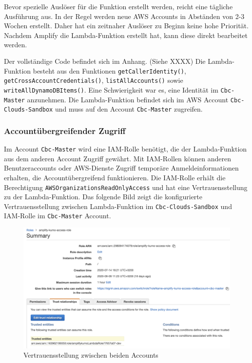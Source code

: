 Bevor spezielle Auslöser für die Funktion erstellt werden, reicht eine tägliche Ausführung aus.
In der Regel werden neue AWS Accounts in Abständen von 2-3 Wochen erstellt.
Daher hat ein zeitnaher Auslöser zu Beginn keine hohe Priorität.
Nachdem Amplify die Lambda-Funktion erstellt hat, kann diese direkt bearbeitet werden.

Der vollständige Code befindet sich im Anhang. (Siehe XXXX)
Die Lambda-Funktion besteht aus den Funktionen \verb+getCallerIdentity()+,
\verb+getCrossAccountCredentials()+, \verb+listAllAccounts()+ sowie \verb+writeAllDynamoDBItems()+.
Eine Schwierigkeit war es, eine Identität im \verb+Cbc-Master+ anzunehmen.
Die Lambda-Funktion befindet sich im AWS Account \verb+Cbc-Clouds-Sandbox+ und muss auf den Account \verb+Cbc-Master+ zugreifen.

\subsubsection{Accountübergreifender Zugriff}

Im Account \verb+Cbc-Master+ wird eine IAM-Rolle benötigt, die der Lambda-Funktion aus dem anderen Account Zugriff gewährt.
Mit IAM-Rollen können anderen Benutzeraccounts oder AWS-Dienste Zugriff temporäre Anmeldeinformationen erhalten, die Accountübergreifend funktionieren.
Die IAM-Rolle erhält die Berechtigung \verb+AWSOrganizationsReadOnlyAccess+ und hat eine Vertrauensstellung zu der Lambda-Funktion.
Das folgende Bild zeigt die konfigurierte Vertrauensstellung zwischen Lambda-Funktion im \verb+Cbc-Clouds-Sandbox+ und IAM-Rolle im \verb+Cbc-Master+ Account.


\begin{figure}[htbp]
    \centering
    \includegraphics[width=1.0\textwidth]{50-Implementierung/IAM-Rolle.png}
    \caption{Vertrauensstellung zwischen beiden Accounts}
    \label{fig:meine-grafik}
\end{figure}


